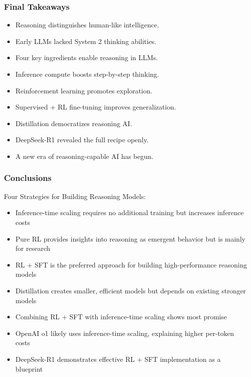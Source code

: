 \begin{frame}[fragile]\frametitle{Final Takeaways}

		\begin{itemize}
		  \item Reasoning distinguishes human-like intelligence.
		  \item Early LLMs lacked System 2 thinking abilities.
		  \item Four key ingredients enable reasoning in LLMs.
		  \item Inference compute boosts step-by-step thinking.
		  \item Reinforcement learning promotes exploration.
		  \item Supervised + RL fine-tuning improves generalization.
		  \item Distillation democratizes reasoning AI.
		  \item DeepSeek-R1 revealed the full recipe openly.
		  \item A new era of reasoning-capable AI has begun.
		\end{itemize}

\end{frame}

\begin{frame}[fragile]\frametitle{Conclusions}

Four Strategies for Building Reasoning Models:

      \begin{itemize}
	\item Inference-time scaling requires no additional training but increases inference costs
	\item Pure RL provides insights into reasoning as emergent behavior but is mainly for research
	\item RL + SFT is the preferred approach for building high-performance reasoning models
	\item Distillation creates smaller, efficient models but depends on existing stronger models
	\item Combining RL + SFT with inference-time scaling shows most promise
	\item OpenAI o1 likely uses inference-time scaling, explaining higher per-token costs
	\item DeepSeek-R1 demonstrates effective RL + SFT implementation as a blueprint
	  \end{itemize}
\end{frame}
